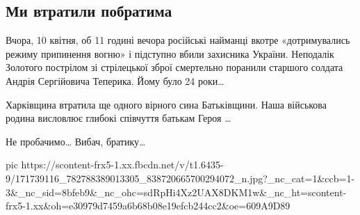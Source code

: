  
 
 
 
 

\subsection{Ми втратили побратима}
\label{sec:11_04_2021.fb.92ombr.1.teperik_andrej_smert_vojna_donbass_zolotoje}

Вчора, 10 квітня, об 11 годині вечора російські найманці вкотре «дотримувались
режиму припинення вогню» і підступно вбили захисника України. Неподалік
Золотого пострілом зі стрілецької зброї смертельно поранили старшого солдата
Андрія Сергійовича Теперика. Йому було 24 роки…

Харківщина втратила ще одного вірного сина Батьківщини. Наша військова родина
висловлює глибокі співчуття батькам Героя …

Не пробачимо… Вибач, братику…

\ifcmt
  pic https://scontent-frx5-1.xx.fbcdn.net/v/t1.6435-9/171739116_782788389013305_838720665700294072_n.jpg?_nc_cat=1&ccb=1-3&_nc_sid=8bfeb9&_nc_ohc=sdRpHi4Xz2UAX8DKM1w&_nc_ht=scontent-frx5-1.xx&oh=e30979d7459a6b68b08e19efcb244cc2&oe=609A9D89
\fi

